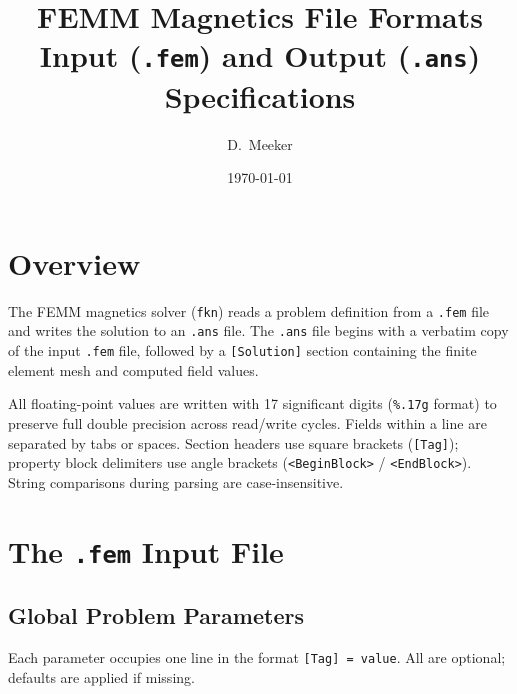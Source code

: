 \documentclass[11pt]{article}
\title{FEMM Magnetics File Formats\\[0.5em]
\large Input (\texttt{.fem}) and Output (\texttt{.ans}) Specifications}
\author{D.\ Meeker}
\date{\today}
\begin{document}
\maketitle
\tableofcontents
\newpage

\section{Overview}

The FEMM magnetics solver (\texttt{fkn}) reads a problem definition from
a \texttt{.fem} file and writes the solution to an \texttt{.ans} file.
The \texttt{.ans} file begins with a verbatim copy of the input
\texttt{.fem} file, followed by a \texttt{[Solution]} section containing
the finite element mesh and computed field values.

All floating-point values are written with 17 significant digits
(\verb|%.17g| format) to preserve full double precision across
read/write cycles.  Fields within a line are separated by tabs or
spaces.  Section headers use square brackets (\verb|[Tag]|); property
block delimiters use angle brackets (\verb|<BeginBlock>| /
\verb|<EndBlock>|).  String comparisons during parsing are
case-insensitive.

\section{The \texttt{.fem} Input File}

\subsection{Global Problem Parameters}

Each parameter occupies one line in the format
\verb|[Tag] = value|.  All are optional; defaults are applied if
missing.
\end{document}

